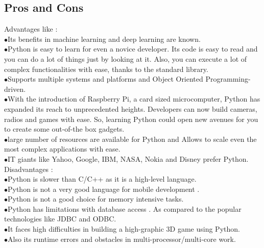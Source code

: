\subsection{Pros and Cons}
Advantages like :\cite{web007}\\
\indent$\bullet$\hspace{5pt}Its benefits in machine learning and deep learning are known.\\
\indent$\bullet$\hspace{5pt}Python is easy to learn for even a novice developer. Its code is easy to read and you can do a lot of things just by looking at it. Also, you can execute a lot of complex functionalities with ease, thanks to the standard library.\\
\indent$\bullet$\hspace{5pt}Supports multiple systems and platforms and Object Oriented Programming-driven.\\
\indent$\bullet$\hspace{5pt}With the introduction of Raspberry Pi, a card sized microcomputer, Python has expanded its reach to unprecedented heights. Developers can now build cameras, radios and games with ease. So, learning Python could open new avenues for you to create some out-of-the box gadgets.\\
\indent$\bullet$\hspace{5pt}large number of resources are available for Python and Allows to scale even the most complex applications with ease.\\
\indent$\bullet$\hspace{5pt}IT giants like Yahoo, Google, IBM, NASA, Nokia and Disney prefer Python.\\
Disadvantages :\\
\indent$\bullet$\hspace{5pt}Python is slower than C/C++ as it is a high-level language.\\
\indent$\bullet$\hspace{5pt}Python is not a very good language for mobile development .\\
\indent$\bullet$\hspace{5pt}Python is not a good choice for memory intensive tasks.\\
\indent$\bullet$\hspace{5pt}Python has limitations with database access . As compared to the popular technologies like JDBC and ODBC.\\
\indent$\bullet$\hspace{5pt}It faces high difficulties in building a high-graphic 3D game using Python.\\
\indent$\bullet$\hspace{5pt}Also its runtime errors and obstacles in multi-processor/multi-core work.
